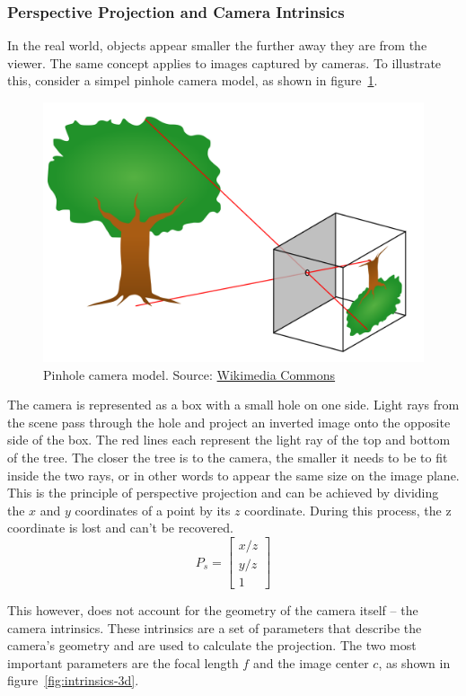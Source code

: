 \subsubsection{Perspective Projection and Camera Intrinsics}\label{sec:perspective-projection}
In the real world, objects appear smaller the further away they are from the viewer.
The same concept applies to images captured by cameras.
To illustrate this, consider a simpel pinhole camera model, as shown in figure~\ref{fig:pinhole-camera-model}.
\begin{figure}[h!]
    \centering
    \includegraphics[width=0.45\linewidth]{images/pinhole}
    \caption{Pinhole camera model. Source: \href{https://commons.wikimedia.org/wiki/File:Pinhole-camera.svg}{Wikimedia Commons}}
    \label{fig:pinhole-camera-model}
\end{figure}
The camera is represented as a box with a small hole on one side.
Light rays from the scene pass through the hole and project an inverted image onto the opposite side of the box.
The red lines each represent the light ray of the top and bottom of the tree.
The closer the tree is to the camera, the smaller it needs to be to fit inside the two rays,
or in other words to appear the same size on the image plane.
This is the principle of perspective projection and can be achieved by dividing the
$x$ and $y$ coordinates of a point by its $z$ coordinate.
During this process, the z coordinate is lost and can't be recovered. \cite{szeliski_computer_nodate}
\begin{equation}
    P_s = \begin{bmatrix}
              x/z \\
              y/z \\
              1
    \end{bmatrix}
\end{equation}

This however, does not account for the geometry of the camera itself -- the camera intrinsics.
These intrinsics are a set of parameters that describe the camera's geometry and are used to calculate the projection.
The two most important parameters are the focal length $f$ and the image center $c$, as shown in figure~\ref{fig:intrinsics-3d}.



